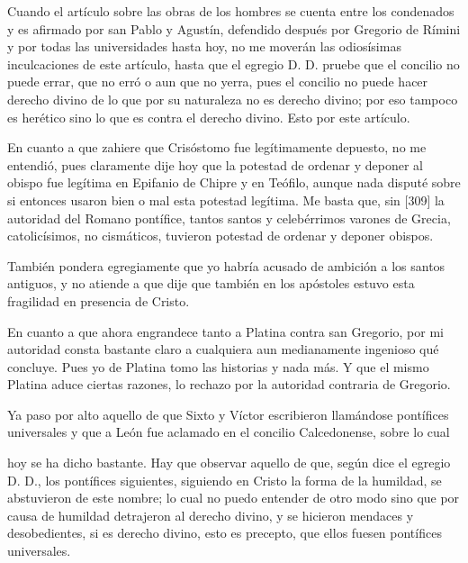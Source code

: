 Cuando el artículo sobre las obras de los hombres se cuenta entre los condenados y es afirmado por san Pablo y Agustín, defendido después por Gregorio de Rímini y por todas las universidades hasta hoy, no me moverán las odiosísimas inculcaciones de este artículo, hasta que el egregio D. D. pruebe que el concilio no puede errar, que no erró o aun que no yerra, pues el concilio no puede hacer derecho divino de lo que por su naturaleza no es derecho divino; por eso tampoco es herético sino lo que es contra el derecho divino. Esto por este artículo.

En cuanto a que zahiere que Crisóstomo fue legítimamente depuesto, no me entendió, pues claramente dije hoy que la potestad de ordenar y deponer al obispo fue legítima en Epifanio de Chipre y en Teófilo, aunque nada disputé sobre si entonces usaron bien o mal esta potestad legítima. Me basta que, sin [309] la autoridad del Romano pontífice, tantos santos y celebérrimos varones de Grecia, catolicísimos, no cismáticos, tuvieron potestad de ordenar y deponer obispos.

También pondera egregiamente que yo habría acusado de ambición a los santos antiguos, y no atiende a que dije que también en los apóstoles estuvo esta fragilidad en presencia de Cristo.

En cuanto a que ahora engrandece tanto a Platina contra san Gregorio, por mi autoridad consta bastante claro a cualquiera aun medianamente ingenioso qué concluye. Pues yo de Platina tomo las historias y nada más. Y que el mismo Platina aduce ciertas razones, lo rechazo por la autoridad contraria de Gregorio.

Ya paso por alto aquello de que Sixto y Víctor escribieron llamándose pontífices universales y que a León fue aclamado en el concilio Calcedonense, sobre lo cual

hoy se ha dicho bastante. Hay que observar aquello de que, según dice el egregio D. D., los pontífices siguientes, siguiendo en Cristo la forma de la humildad, se abstuvieron de este nombre; lo cual no puedo entender de otro modo sino que por causa de humildad detrajeron al derecho divino, y se hicieron mendaces y desobedientes, si es derecho divino, esto es precepto, que ellos fuesen pontífices universales.

